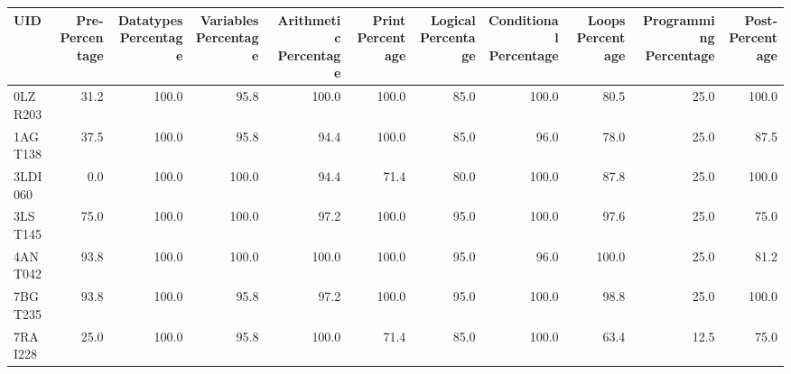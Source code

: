 \begin{tabular}{lrrrrrrrrrr}
\toprule
    UID &  Pre-Percentage &  Datatypes Percentage &  Variables Percentage &  Arithmetic Percentage &  Print Percentage &  Logical Percentage &  Conditional Percentage &  Loops Percentage &  Programming Percentage &  Post-Percentage \\
\midrule
0LZR203 &            31.2 &                 100.0 &                  95.8 &                  100.0 &             100.0 &                85.0 &                   100.0 &              80.5 &                    25.0 &            100.0 \\
1AGT138 &            37.5 &                 100.0 &                  95.8 &                   94.4 &             100.0 &                85.0 &                    96.0 &              78.0 &                    25.0 &             87.5 \\
3LDI060 &             0.0 &                 100.0 &                 100.0 &                   94.4 &              71.4 &                80.0 &                   100.0 &              87.8 &                    25.0 &            100.0 \\
3LST145 &            75.0 &                 100.0 &                 100.0 &                   97.2 &             100.0 &                95.0 &                   100.0 &              97.6 &                    25.0 &             75.0 \\
4ANT042 &            93.8 &                 100.0 &                 100.0 &                  100.0 &             100.0 &                95.0 &                    96.0 &             100.0 &                    25.0 &             81.2 \\
7BGT235 &            93.8 &                 100.0 &                  95.8 &                   97.2 &             100.0 &                95.0 &                   100.0 &              98.8 &                    25.0 &            100.0 \\
7RAI228 &            25.0 &                 100.0 &                  95.8 &                  100.0 &              71.4 &                85.0 &                   100.0 &              63.4 &                    12.5 &             75.0 \\
\bottomrule
\end{tabular}
